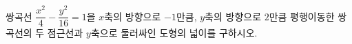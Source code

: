 쌍곡선 $\dfrac{x^2}{4}-\dfrac{y^2}{16}=1$을 $x$축의 방향으로 $-1$만큼, $y$축의 방향으로 $2$만큼 평행이동한 쌍곡선의 두 점근선과 $y$축으로 둘러싸인 도형의 넓이를 구하시오.
